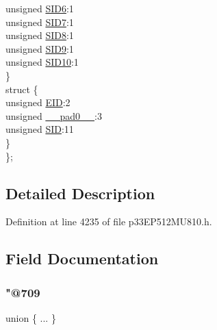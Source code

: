 \begin{DoxyCompactItemize}
\begin{tabbing}
\>\>unsigned \hyperlink{structtag_c1_r_x_f9_s_i_d_b_i_t_s_a70d70952133eb2389d5c326f9f0e8035}{SID6}:1\\
\>\>unsigned \hyperlink{structtag_c1_r_x_f9_s_i_d_b_i_t_s_a34097fb76decd431701fa2d86a22328e}{SID7}:1\\
\>\>unsigned \hyperlink{structtag_c1_r_x_f9_s_i_d_b_i_t_s_afe74894633244fdb0b0c01b4e8c522e7}{SID8}:1\\
\>\>unsigned \hyperlink{structtag_c1_r_x_f9_s_i_d_b_i_t_s_a33587704948067005c2a6a3ccc503c99}{SID9}:1\\
\>\>unsigned \hyperlink{structtag_c1_r_x_f9_s_i_d_b_i_t_s_a1a9084031c7f5fb16007feeebf0d8216}{SID10}:1\\
\>\} \\
\>struct \{\\
\>\>unsigned \hyperlink{structtag_c1_r_x_f9_s_i_d_b_i_t_s_ae80b378c9141f7c03e0b4e55b5f4b54d}{EID}:2\\
\>\>unsigned \hyperlink{structtag_c1_r_x_f9_s_i_d_b_i_t_s_adf71f3d8410c1f1dbbc96680a92c49af}{\_\_pad0\_\_}:3\\
\>\>unsigned \hyperlink{structtag_c1_r_x_f9_s_i_d_b_i_t_s_af88edf93b2fee2432665bd84f51287e4}{SID}:11\\
\>\} \\
\}; \\

\end{tabbing}\end{DoxyCompactItemize}


\subsection{Detailed Description}


Definition at line 4235 of file p33\+E\+P512\+M\+U810.\+h.



\subsection{Field Documentation}
\mbox{\label{structtag_c1_r_x_f9_s_i_d_b_i_t_s_ae23bb053f4a84eb64c114054a04e7b4f}} 
\subsubsection{\texorpdfstring{"@709}{@709}}
{\footnotesize\ttfamily union \{ ... \} }

\mbox{\label{structtag_c1_r_x_f9_s_i_d_b_i_t_s_adf71f3d8410c1f1dbbc96680a92c49af}} 
